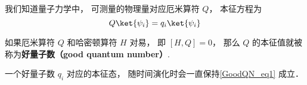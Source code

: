 

我们知道量子力学中， 可测量的物理量对应厄米算符 $Q$， 本征方程为
\begin{equation}\label{GoodQN_eq1}
Q \ket{\psi_i} = q_i \ket{\psi_i}
\end{equation}

\begin{definition}{}
如果厄米算符 $Q$ 和哈密顿算符 $H$ 对易， 即 $[H, Q] = 0$， 那么 $Q$ 的本征值就被称为\textbf{好量子数（good quantum number）}.
\end{definition}

一个好量子数 $q_i$ 对应的本征态， 随时间演化时会一直保持\autoref{GoodQN_eq1} 成立．

